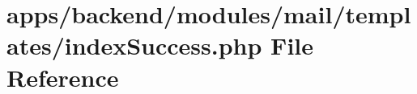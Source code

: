 \hypertarget{backend_2modules_2mail_2templates_2index_success_8php}{\section{apps/backend/modules/mail/templates/index\-Success.php File Reference}
\label{backend_2modules_2mail_2templates_2index_success_8php}
}

